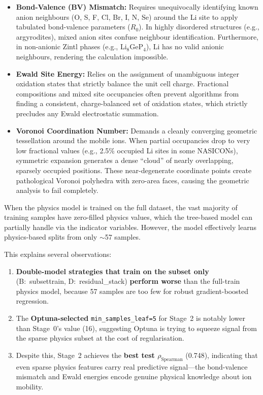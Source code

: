 \documentclass[11pt,a4paper]{article}
\newcommand{\rhoS}{\rho_{\text{Spearman}}}
\begin{document}
\begin{itemize}[leftmargin=*]
      \item \textbf{Bond-Valence (BV) Mismatch:} Requires unequivocally identifying known anion neighbours (O, S, F, Cl, Br, I, N, Se) around the Li site to apply tabulated bond-valence parameters ($R_0$). In highly disordered structures (e.g., argyrodites), mixed anion sites confuse neighbour identification. Furthermore, in non-anionic Zintl phases (e.g., Li$_8$GeP$_4$), Li has no valid anionic neighbours, rendering the calculation impossible.
      \item \textbf{Ewald Site Energy:} Relies on the assignment of unambiguous integer oxidation states that strictly balance the unit cell charge. Fractional compositions and mixed site occupancies often prevent algorithms from finding a consistent, charge-balanced set of oxidation states, which strictly precludes any Ewald electrostatic summation.
      \item \textbf{Voronoi Coordination Number:} Demands a cleanly converging geometric tessellation around the mobile ions. When partial occupancies drop to very low fractional values (e.g., 2.5\% occupied Li sites in some NASICONs), symmetric expansion generates a dense ``cloud'' of nearly overlapping, sparsely occupied positions. These near-degenerate coordinate points create pathological Voronoi polyhedra with zero-area faces, causing the geometric analysis to fail completely.
\end{itemize}

When the physics model is trained on the full dataset, the vast majority of
training samples have zero-filled physics values, which the tree-based model
can partially handle via the indicator variables.  However, the model
effectively learns physics-based splits from only $\sim$57 samples.

This explains several observations:

\begin{enumerate}[leftmargin=*]
      \item \textbf{Double-model strategies that train on the subset only}
            (B:~subsettrain, D:~residual\_stack) \textbf{perform worse} than
            the full-train physics model, because 57 samples are too few
            for robust gradient-boosted regression.
      \item The \textbf{Optuna-selected} \texttt{min\_samples\_leaf=5} for
            Stage~2 is notably lower than Stage~0's value (16), suggesting
            Optuna is trying to squeeze signal from the sparse physics subset
            at the cost of regularisation.
      \item Despite this, Stage~2 achieves the \textbf{best test $\rhoS$}
            (0.748), indicating that even sparse physics features carry real
            predictive signal---the bond-valence mismatch and Ewald energies
            encode genuine physical knowledge about ion mobility.
\end{enumerate}
\end{document}
